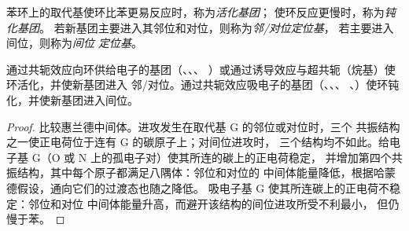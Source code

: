 \begin{definition}[定位基]\label{def:b2:aromatic-substitution:directing}
苯环上的取代基使环比苯更易反应时，称为\emph{活化基团}；
使环反应更慢时，称为\emph{钝化基团}。
若新基团主要进入其邻位和对位，则称为\emph{邻/对位定位基}，
若主要进入间位，则称为\emph{间位
定位基}。
\end{definition}

\begin{proposition}[给电子基团与吸电子基团]\label{prop:b2:aromatic-substitution:directing}
通过共轭效应向环供给电子的基团（、、、
）或通过诱导效应与超共轭（烷基）使环活化，并使新基团进入
邻/对位。通过共轭效应吸电子的基团（、、、
、）使环钝化，并使新基团进入间位。
\end{proposition}

\begin{proof}
比较惠兰德中间体。进攻发生在取代基 G 的邻位或对位时，三个
共振结构之一使正电荷位于连有 G 的碳原子上；对间位进攻时，
三个结构均不如此。给电子基 G（O 或 N 上的孤电子对）使其所连的碳上的正电荷稳定，
并增加第四个共振结构，其中每个原子都满足八隅体：邻位和对位的
中间体能量降低，根据哈蒙德假设，通向它们的过渡态也随之降低。
吸电子基 G 使其所连碳上的正电荷不稳定：邻位和对位
中间体能量升高，而避开该结构的间位进攻所受不利最小，
但仍慢于苯。
\end{proof}

